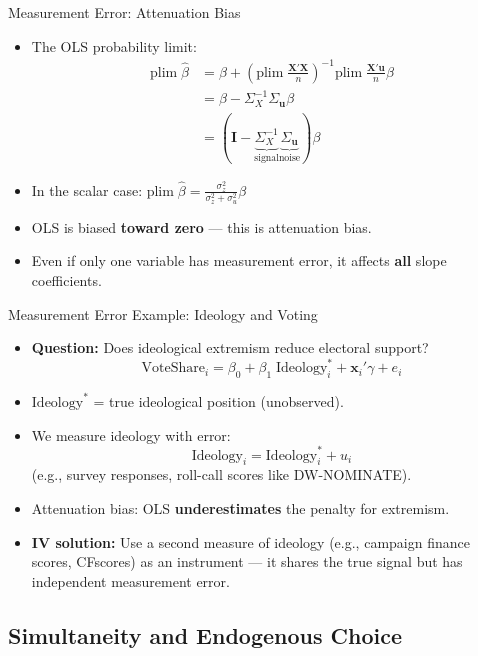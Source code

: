 \documentclass[aspectratio=169, handout]{beamer}
\numberwithin{equation}{section}
\begin{document}
\begin{frame}{Measurement Error: Attenuation Bias}
\begin{itemize}
\item The OLS probability limit:
\begin{align*}
\text{plim}\;\hat{\beta}&=\beta+\left(\text{plim}\;\frac{\bm{X}'\bm{X}}{n}\right)^{-1}\text{plim}\;\frac{\bm{X}'\bm{u}}{n}\beta\\
&= \beta - \Sigma_X^{-1}\Sigma_{\bm{u}}\beta\\
&= \left(\bm{I}-\underbrace{\Sigma_X^{-1}}_{\text{signal}}\underbrace{\Sigma_{\bm{u}}}_{\text{noise}}\right)\beta
\end{align*}
\item In the scalar case: $\text{plim}\;\hat{\beta}=\frac{\sigma_z^2}{\sigma_z^2+\sigma_u^2}\beta$
\item OLS is biased \textbf{toward zero} --- this is \alert{attenuation bias}.
\item Even if only one variable has measurement error, it affects \textbf{all} slope coefficients.
\end{itemize}
\end{frame}


\begin{frame}{Measurement Error Example: Ideology and Voting}
\begin{itemize}
\item \textbf{Question:} Does ideological extremism reduce electoral support?
$$\text{VoteShare}_i = \beta_0 + \beta_1\;\text{Ideology}_i^* + \bm{x}_i'\gamma + e_i$$
\item $\text{Ideology}^*$ = true ideological position (unobserved).
\item We measure ideology with error:
$$\text{Ideology}_i = \text{Ideology}_i^* + u_i$$
(e.g., survey responses, roll-call scores like DW-NOMINATE).
\item Attenuation bias: OLS \textbf{underestimates} the penalty for extremism.
\item \textbf{IV solution:} Use a second measure of ideology (e.g., campaign finance scores, CFscores) as an instrument --- it shares the true signal but has independent measurement error.
\end{itemize}
\end{frame}


\subsection{Simultaneity and Endogenous Choice}
\end{document}
